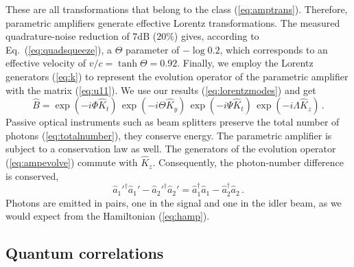 \documentclass[12pt,amsmath,amssymb]{article}
\numberwithin{equation}{section}
\begin{document}
These are all transformations that belong to the class (\ref{eq:amptrans}).
Therefore, parametric amplifiers generate effective Lorentz
transformations. The measured quadrature-noise reduction
\cite{Lam} of $7\mbox{dB}$ ($20\%$)
gives, according to Eq.\ (\ref{eq:quadsqueeze}),
a $\Theta$ parameter of $-\log 0.2$, which corresponds to
an effective velocity of $v/c=\tanh \Theta=0.92$.
Finally, we employ the Lorentz generators (\ref{eq:k})
to represent the evolution
operator of the parametric amplifier with the matrix (\ref{eq:u11}).
We use our results (\ref{eq:lorentzmodes}) and get
\begin{equation}
\label{eq:ampevolve}
\hat{B} = \exp(-i\Phi\hat{K}_t)\, \exp(-i\Theta\hat{K}_y)\,
\exp(-i\Psi\hat{K}_t)\, \exp(-i\Lambda\hat{K}_z)\,.
\end{equation}
Passive optical instruments such as beam splitters preserve the
total number of photons (\ref{eq:totalnumber}), they
conserve energy. The parametric amplifier is subject to a
conservation law as well. The generators of the evolution
operator (\ref{eq:ampevolve}) commute with $\hat{K}_z$.
Consequently, the photon-number difference is conserved,
\begin{equation}
\label{eq:diff}
\hat{a}_1'^\dagger\hat{a}_1' - \hat{a}_2'^\dagger\hat{a}_2' =
\hat{a}_1^\dagger\hat{a}_1 - \hat{a}_2^\dagger\hat{a}_2 \,.
\end{equation}
Photons are emitted in pairs, one in the signal and one in the
idler beam, as we would expect from the Hamiltonian (\ref{eq:hamp}).

\subsection{Quantum correlations}
\end{document}
